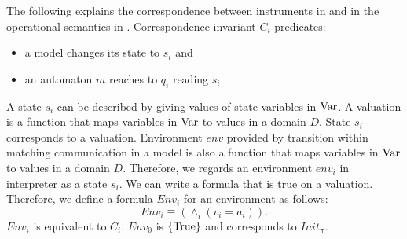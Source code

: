 \documentclass[12pt,a4paper,titlepage]{article}
\theoremstyle{break}
\begin{document}
The following explains the correspondence between instruments in  and in the operational semantics in .
Correspondence invariant \(C_i\) predicates:
  \begin{itemize}
\item a model changes its state to \(s_i\) and
\item an automaton $m$ reaches to \(q_i\) reading \(s_i\).
  \end{itemize}
A state \(s_i\) can be described by giving values of state variables in \(\mathop{\mathrm{Var}}\nolimits\).
A valuation is a function that maps variables in \(\mathop{\mathrm{Var}}\nolimits\) to values in a domain \(D\).
State \(s_i\) corresponds to a valuation.
Environment \(env\) provided by transition within matching communication in a model is also a function that maps variables in \(\mathop{\mathrm{Var}}\nolimits\) to values in a domain \(D\).
Therefore, we regards an environment \(env_i\) in \NHK interpreter as a state \(s_i\).
We can write a formula that is true on a valuation.
Therefore, we define a formula \(Env_i\) for an environment as follows:
  \begin{displaymath}
Env_i\equiv({\displaystyle\wedge_{i}}(v_i=a_i)).
  \end{displaymath}
\(Env_i\) is equivalent to \(C_i\).
\(Env_0\) is \(\{\mathop{\mathrm{True}}\nolimits\}\) and corresponds to \(Init_{\pi}\).
\end{document}

